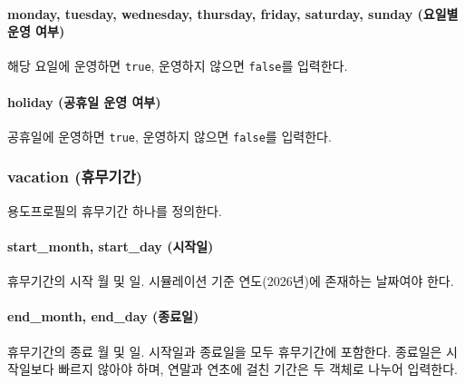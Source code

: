 
\paragraph{monday, tuesday, wednesday, thursday, friday, saturday, sunday (요일별 운영 여부)} 해당 요일에 운영하면 \texttt{true}, 운영하지 않으면 \texttt{false}를 입력한다.

\paragraph{holiday (공휴일 운영 여부)} 공휴일에 운영하면 \texttt{true}, 운영하지 않으면 \texttt{false}를 입력한다.

\subsubsection{vacation (휴무기간)} \label{subsubsection:ioref:vacation}
용도프로필의 휴무기간 하나를 정의한다.


\paragraph{start\_month, start\_day (시작일)} 휴무기간의 시작 월 및 일. 시뮬레이션 기준 연도(2026년)에 존재하는 날짜여야 한다.

\paragraph{end\_month, end\_day (종료일)} 휴무기간의 종료 월 및 일. 시작일과 종료일을 모두 휴무기간에 포함한다. 종료일은 시작일보다 빠르지 않아야 하며, 연말과 연초에 걸친 기간은 두 객체로 나누어 입력한다.


